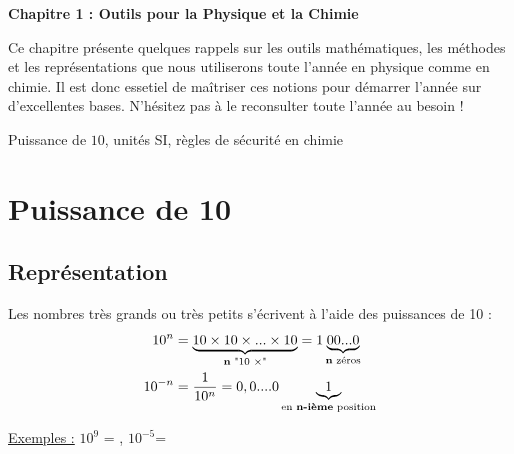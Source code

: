 \newpage

\renewcommand{\thesubsection}{\textcolor{red}{\Roman{section}.\arabic{subsection}}}
\renewcommand{\thesubsubsection}{\textcolor{red}{\Roman{section}.\arabic{subsection}.\alph{subsubsection}}}

\setcounter{section}{0}
\sndEnTeteUn

\begin{center}
\begin{mdframed}[style=titr, leftmargin=60pt, rightmargin=60pt, innertopmargin=7pt, innerbottommargin=7pt, innerrightmargin=8pt, innerleftmargin=8pt]

\begin{center}
\large{\textbf{Chapitre 1 : Outils pour la Physique et la Chimie}}
\end{center}

\end{mdframed}
\end{center}
Ce chapitre présente quelques rappels sur les outils mathématiques, les méthodes et les représentations que nous utiliserons toute l'année en physique comme en chimie. Il est donc essetiel de maîtriser ces notions pour démarrer l'année sur d'excellentes bases. N'hésitez pas à le reconsulter toute l'année au besoin !

\begin{tcolorbox}[colback=blue!5!white,colframe=blue!75!black,title=Mots clés du chapitre :]
Puissance de $10$, unités SI, règles de sécurité en chimie
\end{tcolorbox}

\section{Puissance de 10}
\subsection{Représentation}
Les nombres très grands ou très petits s'écrivent à l'aide des puissances de 10 :
\begin{align*}
    10^n &= \underbrace{10\times10\times ... \times 10}_{\text{\textbf{n} "10 $\times$"}} = 1\underbrace{00...0}_{\text{\textbf{n} zéros}} \\
    10^{-n} &= \frac{1}{10^n} = 0,0....0\underbrace{1}_{\text{en \textbf{n-ième} position}}
\end{align*}

\underline{Exemples :} $10^9$ = ,    $10^{-5}$=\\

